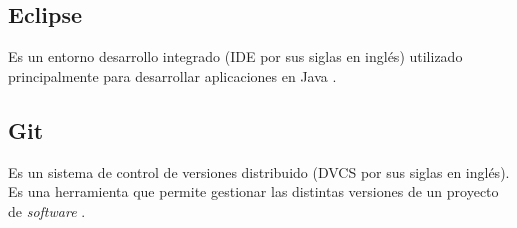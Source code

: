 \subsection{Eclipse}
Es un entorno desarrollo integrado (IDE por sus siglas en inglés) utilizado principalmente para desarrollar aplicaciones en Java \cite{ECL1}.

\subsection{Git}
Es un sistema de control de versiones distribuido (DVCS por sus siglas en inglés). Es una herramienta que permite gestionar las distintas versiones de un proyecto de \textit{software} \cite{GIT1}.
